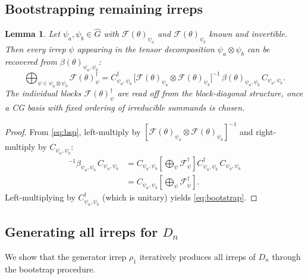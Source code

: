\documentclass{article}
\newtheorem{lemma}[theorem]{Lemma}
\theoremstyle{definition}
\theoremstyle{remark}
\newcommand{\FF}{\mathcal{F}}
\newcommand{\Ghat}{\widehat{G}}
\begin{document}
\subsection{Bootstrapping remaining irreps}

\begin{lemma}\label{lem:bootstrap}
Let $\psi_a, \psi_b \in \Ghat$ with $\FF(\theta)_{\psi_a}$ and $\FF(\theta)_{\psi_b}$ known and invertible. Then every irrep $\psi$ appearing in the tensor decomposition $\psi_a \otimes \psi_b$ can be recovered from $\beta(\theta)_{\psi_a, \psi_b}$:
\begin{equation}\label{eq:bootstrap}
\bigoplus_{\psi \in \psi_a \otimes \psi_b} \FF(\theta)_\psi^\dagger
= C_{\psi_a,\psi_b}^\dagger\,
\bigl[\FF(\theta)_{\psi_a} \otimes \FF(\theta)_{\psi_b}\bigr]^{-1}\,
\beta(\theta)_{\psi_a, \psi_b}\,
C_{\psi_a,\psi_b}.
\end{equation}
The individual blocks $\FF(\theta)_\psi^\dagger$ are read off from the block-diagonal structure, once a CG basis with fixed ordering of irreducible summands is chosen.
\end{lemma}
\begin{proof}
From \eqref{eq:bsp}, left-multiply by $[\FF(\theta)_{\psi_a} \otimes \FF(\theta)_{\psi_b}]^{-1}$ and right-multiply by $C_{\psi_a,\psi_b}$:
\begin{align*}
[\FF_{\psi_a} \otimes \FF_{\psi_b}]^{-1} \beta_{\psi_a,\psi_b}\, C_{\psi_a,\psi_b}
&= C_{\psi_a,\psi_b} \left[\bigoplus_\psi \FF_\psi^\dagger\right] C_{\psi_a,\psi_b}^\dagger\, C_{\psi_a,\psi_b} \\
&= C_{\psi_a,\psi_b} \left[\bigoplus_\psi \FF_\psi^\dagger\right].
\end{align*}
Left-multiplying by $C_{\psi_a,\psi_b}^\dagger$ (which is unitary) yields \eqref{eq:bootstrap}.
\end{proof}

\subsection{Generating all irreps for $D_n$}

We show that the generator irrep $\rho_1$ iteratively produces all irreps of $D_n$ through the bootstrap procedure.
\end{document}
